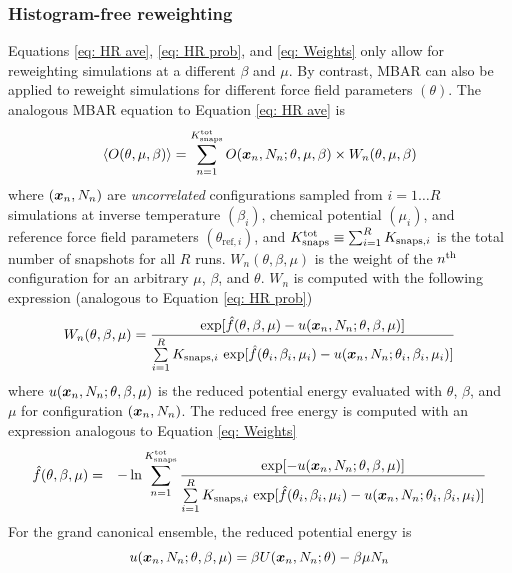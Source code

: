 \documentclass[journal=jced,manuscript=article]{achemso}
\newcommand{\bfv}[1]{{\mbox{\boldmath{$#1$}}}}
\newcommand{\x}{\bfv{x}}
\begin{document}
\subsubsection{Histogram-free reweighting} \label{sec: MBAR}

Equations \ref{eq: HR ave}, \ref{eq: HR prob}, and \ref{eq: Weights} only allow for reweighting simulations at a different $\beta$ and $\mu$. By contrast, MBAR can also be applied to reweight simulations for different force field parameters $(\theta)$. The analogous MBAR equation to Equation \ref{eq: HR ave} is
\begin{eqnarray} \label{eq: MBAR ave}
\langle O(\theta,\mu,\beta)\rangle = \sum_{n=1}^{K^{\rm tot}_{\rm snaps}} O(\x_{n},N_n;\theta,\mu,\beta) \times W_{n}(\theta,\mu,\beta)
\end{eqnarray}
where $(\x_n,N_n)$ are \textit{uncorrelated} configurations sampled from $i=1 \ldots R$ simulations at inverse temperature $(\beta_{i})$, chemical potential $(\mu_{i})$, and reference force field parameters $(\theta_{\mathrm{ref},i})$, and $K^{\rm tot}_{\rm snaps} \equiv \sum_{i=1}^R K_{\mathrm{snaps}, i}$ is the total number of snapshots for all $R$ runs. $W_{n}(\theta,\beta,\mu)$ is the weight of the $n^{\rm th}$ configuration for an arbitrary $\mu$, $\beta$, and $\theta$. $W_{n}$ is computed with the following expression (analogous to Equation \ref{eq: HR prob})
\begin{eqnarray} \label{eq: MBAR weights}
W_{n}(\theta,\beta,\mu) = \frac{\exp[\hat{f}(\theta,\beta,\mu)-u(\x_{n},N_n;\theta,\beta,\mu)]}{\sum\limits_{i=1}^R K_{\mathrm{snaps}, i} \, \exp[\hat{f}(\theta_i,\beta_{i},\mu_{i}) - u(\x_{n},N_n;\theta_i,\beta_{i},\mu_{i})]}
\end{eqnarray}
where $u(\x_{n},N_n;\theta,\beta,\mu)$ is the reduced potential energy evaluated with $\theta$, $\beta$, and $\mu$ for configuration $(\x_n,N_n)$. The reduced free energy is computed with an expression analogous to Equation \ref{eq: Weights}
\begin{eqnarray} \label{eq: MBAR free energy}
\hat f(\theta,\beta,\mu) &=& - \ln \sum_{n=1}^{K^{\rm tot}_{\rm snaps}}
\frac{\exp[-u(\x_{n},N_n;\theta,\beta,\mu)]}{\sum\limits_{i=1}^R K_{\mathrm{snaps}, i} \, \exp[\hat{f}(\theta_i,\beta_{i},\mu_{i}) - u(\x_{n},N_n;\theta_i,\beta_{i},\mu_{i})]}
\end{eqnarray}
For the grand canonical ensemble, the reduced potential energy is
\begin{equation} \label{eq: reduced potential}
u(\x_{n},N_n;\theta,\beta,\mu) = \beta U(\x_n,N_n;\theta) - \beta \mu N_n
\end{equation} 
\end{document}
